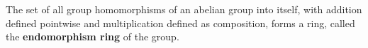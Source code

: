 The set of all group homomorphisms of an abelian group into itself, with addition defined pointwise and multiplication defined as composition, forms a ring, called the \textbf{endomorphism ring} of the group.
